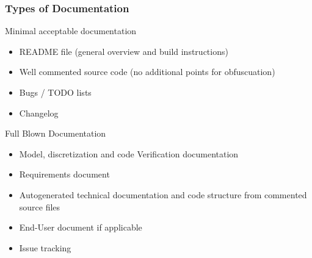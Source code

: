 \documentclass[mathserif]{beamer}
\begin{document}
%
%
%
\begin{frame}
\frametitle{Types of Documentation}
\begin{block}{Minimal acceptable documentation}
\begin{itemize}
\item README file (general overview and build instructions)
\item Well commented source code (no additional points for obfuscuation)
\item Bugs / TODO lists
\item Changelog
\end{itemize}
\end{block}
\begin{block}{Full Blown Documentation}
\begin{itemize}
\item Model, discretization and code Verification documentation
\item Requirements document
\item Autogenerated technical documentation and code structure from commented source files
\item End-User document if applicable
\item Issue tracking
\end{itemize}
\end{block}
\end{frame}
\end{document}
